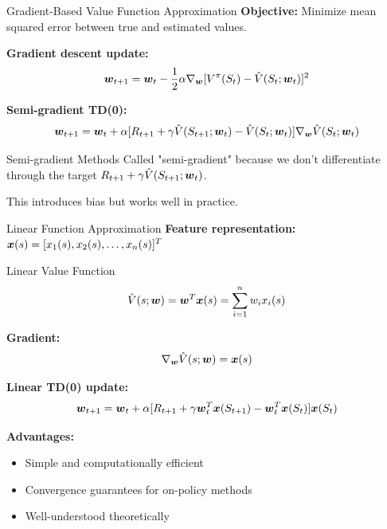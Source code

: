 \documentclass[aspectratio=169]{beamer}
\begin{document}
\begin{frame}{Gradient-Based Value Function Approximation}
  \textbf{Objective:} Minimize mean squared error between true and estimated values.

  \vspace{0.5em}

  \textbf{Gradient descent update:}
  $$\boldsymbol{w}_{t+1} = \boldsymbol{w}_t - \frac{1}{2}\alpha \nabla_{\boldsymbol{w}} [V^\pi(S_t) - \hat{V}(S_t; \boldsymbol{w}_t)]^2$$

  \vspace{0.5em}

  \textbf{Semi-gradient TD(0):}
  $$\boldsymbol{w}_{t+1} = \boldsymbol{w}_t + \alpha[R_{t+1} + \gamma \hat{V}(S_{t+1}; \boldsymbol{w}_t) - \hat{V}(S_t; \boldsymbol{w}_t)] \nabla_{\boldsymbol{w}} \hat{V}(S_t; \boldsymbol{w}_t)$$

  \vspace{0.5em}

  \begin{alertbox}{Semi-gradient Methods}
    Called "semi-gradient" because we don't differentiate through the target $R_{t+1} + \gamma \hat{V}(S_{t+1}; \boldsymbol{w}_t)$.

    This introduces bias but works well in practice.
  \end{alertbox}
\end{frame}

\begin{frame}{Linear Function Approximation}
  \textbf{Feature representation:} $\boldsymbol{x}(s) = [x_1(s), x_2(s), \ldots, x_n(s)]^T$

  \vspace{0.5em}

  \begin{definitionbox}{Linear Value Function}
    $$\hat{V}(s; \boldsymbol{w}) = \boldsymbol{w}^T \boldsymbol{x}(s) = \sum_{i=1}^n w_i x_i(s)$$
  \end{definitionbox}

  \vspace{0.5em}

  \textbf{Gradient:}
  $$\nabla_{\boldsymbol{w}} \hat{V}(s; \boldsymbol{w}) = \boldsymbol{x}(s)$$

  \vspace{0.5em}

  \textbf{Linear TD(0) update:}
  $$\boldsymbol{w}_{t+1} = \boldsymbol{w}_t + \alpha[R_{t+1} + \gamma \boldsymbol{w}_t^T \boldsymbol{x}(S_{t+1}) - \boldsymbol{w}_t^T \boldsymbol{x}(S_t)] \boldsymbol{x}(S_t)$$

  \vspace{0.5em}

  \textbf{Advantages:}
  \begin{itemize}
    \item Simple and computationally efficient
    \item Convergence guarantees for on-policy methods
    \item Well-understood theoretically
  \end{itemize}
\end{frame}
\end{document}

